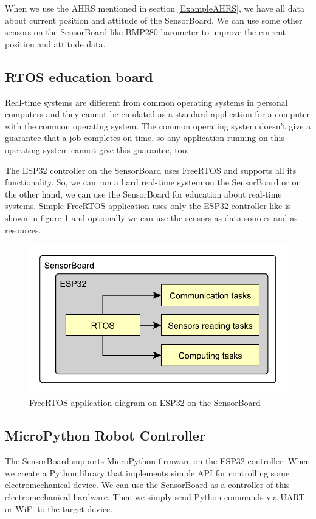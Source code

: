 When we use the AHRS mentioned in section \ref{ExampleAHRS}, we have all data about current position and attitude of the SensorBoard. We can use some other sensors on the SensorBoard like BMP280 barometer \cite{bosch:BMP280} to improve the current position and attitude data.

\subsection{RTOS education board}
Real-time systems are different from common operating systems in personal computers and they cannot be emulated as a standard application for a computer with the common operating system. The common operating system doesn't give a guarantee that a job completes on time, so any application running on this operating system cannot give this guarantee, too.

The ESP32 controller on the SensorBoard uses FreeRTOS and supports all its functionality. \cite{ESP32FreeRTOS} So, we can run a hard real-time system on the SensorBoard or on the other hand, we can use the SensorBoard for education about real-time systems. Simple FreeRTOS application uses only the ESP32 controller like is shown in figure \ref{UEFreeRTOS} and optionally we can use the sensors as data sources and as resources.

\begin{figure}[H]
	\centering
	\label{UEFreeRTOS}
	\caption{FreeRTOS application diagram on ESP32 on the SensorBoard}
	\includegraphics[scale=1]{img/UsageExamplesRTOS.pdf}
\end{figure}

\subsection{MicroPython Robot Controller}
The SensorBoard supports MicroPython firmware \cite{MicroPython} on the ESP32 controller. When we create a Python library that implements simple API for controlling some electromechanical device. We can use the SensorBoard as a controller of this electromechanical hardware. Then we simply send Python commands via UART or WiFi to the target device.

